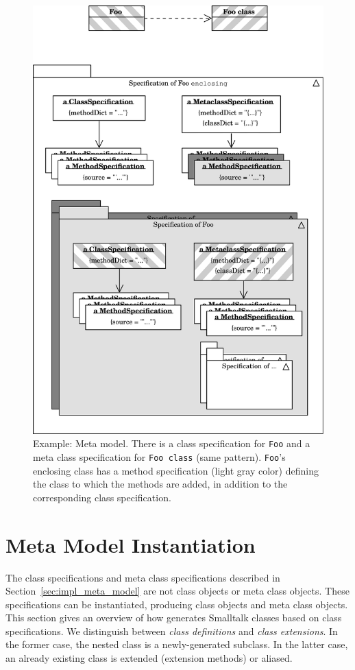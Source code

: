 \begin{figure}[!htp]
	\centering
	\includegraphics[width=\textwidth]{spec_example_r.pdf}
	\caption[Example: Meta model]{Example: Meta model. There is a class specification for \texttt{Foo} and a meta class specification for \texttt{Foo class} (same pattern). \texttt{Foo}'s enclosing class has a method specification (light gray color) defining the class to which the methods are added, in addition to the corresponding class specification.}
	\label{fig:impl_spec_example}
\end{figure}

\section{Meta Model Instantiation}
The class specifications and meta class specifications described in Section~\ref{sec:impl_meta_model} are not class objects or meta class objects. These specifications can be instantiated, producing class objects and meta class objects. This section gives an overview of how \msname generates Smalltalk classes based on class specifications. We distinguish between \emph{class definitions} and \emph{class extensions}. In the former case, the nested class is a newly-generated subclass. In the latter case, an already existing class is extended (extension methods) or aliased. 

